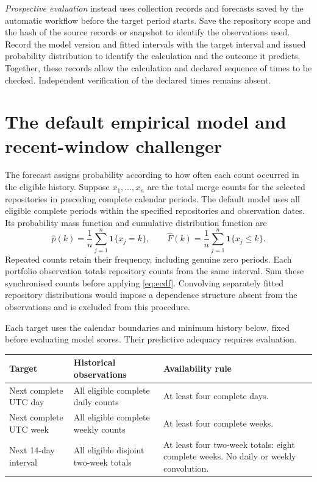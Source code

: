 \documentclass[11pt,a4paper]{article}
\newcommand{\ind}{\mathbf{1}}
\begin{document}
\emph{Prospective evaluation} instead uses collection records and forecasts saved by the automatic workflow before the target period starts. Save the repository scope and the hash of the source records or snapshot to identify the observations used. Record the model version and fitted intervals with the target interval and issued probability distribution to identify the calculation and the outcome it predicts. Together, these records allow the calculation and declared sequence of times to be checked. Independent verification of the declared times remains absent.

\section{The default empirical model and recent-window challenger}
\label{sec:model}

The forecast assigns probability according to how often each count occurred in the eligible history. Suppose $x_1,\ldots,x_n$ are the total merge counts for the selected repositories in preceding complete calendar periods. The default model uses all eligible complete periods within the specified repositories and observation dates. Its probability mass function and cumulative distribution function are
\begin{equation}
 \widehat p(k)=\frac1n\sum_{j=1}^n\ind\{x_j=k\},
 \qquad
 \widehat F(k)=\frac1n\sum_{j=1}^n\ind\{x_j\leq k\}.
 \label{eq:ecdf}
\end{equation}
Repeated counts retain their frequency, including genuine zero periods. Each portfolio observation totals repository counts from the same interval. Sum these synchronised counts before applying \eqref{eq:ecdf}. Convolving separately fitted repository distributions would impose a dependence structure absent from the observations and is excluded from this procedure.

Each target uses the calendar boundaries and minimum history below, fixed before evaluating model scores. Their predictive adequacy requires evaluation.

\begin{center}
\begin{tabularx}{\linewidth}{@{}l>{\raggedright\arraybackslash}X>{\raggedright\arraybackslash}X@{}}
\toprule
Target & Historical observations & Availability rule \\
\midrule
Next complete UTC day & All eligible complete daily counts & At least four complete days. \\
Next complete UTC week & All eligible complete weekly counts & At least four complete weeks. \\
Next 14-day interval & All eligible disjoint two-week totals & At least four two-week totals: eight complete weeks. No daily or weekly convolution. \\
\bottomrule
\end{tabularx}
\end{center}
\end{document}
